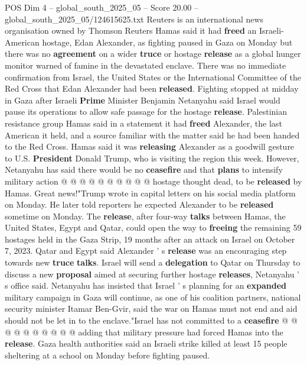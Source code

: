 \begin{textsample}{POS Dim 4 – global\_south\_2025\_05 – Score 20.00 – global\_south\_2025\_05/124615625.txt}  \label{ex:f4_pos_099}
Reuters is an international news organisation owned by Thomson Reuters Hamas said it had \textbf{freed} an Israeli-American hostage, Edan Alexander, as fighting paused in Gaza on Monday but there was no \textbf{agreement} on a wider \textbf{truce} or hostage \textbf{release} as a global hunger monitor warned of famine in the devastated enclave.
There was no immediate confirmation from Israel, the United States or the International Committee of the Red Cross that Edan Alexander had been \textbf{released}.
Fighting stopped at midday in Gaza after Israeli \textbf{Prime} Minister Benjamin Netanyahu said Israel would pause its operations to allow safe passage for the hostage \textbf{release}.
Palestinian resistance group Hamas said in a statement it had \textbf{freed} Alexander, the last American it held, and a source familiar with the matter said he had been handed to the Red Cross.
Hamas said it was \textbf{releasing} Alexander as a goodwill gesture to U.S. \textbf{President} Donald Trump, who is visiting the region this week.
However, Netanyahu has said there would be no \textbf{ceasefire} and that \textbf{plans} to intensify military action @ @ @ @ @ @ @ @ @ @ hostage thought dead, to be \textbf{released} by Hamas.
Great news!"Trump wrote in capital letters on his social media platform on Monday.
He later told reporters he expected Alexander to be \textbf{released} sometime on Monday.
The \textbf{release}, after four-way \textbf{talks} between Hamas, the United States, Egypt and Qatar, could open the way to \textbf{freeing} the remaining 59 hostages held in the Gaza Strip, 19 months after an attack on Israel on October 7, 2023.
Qatar and Egypt said Alexander ' s \textbf{release} was an encouraging step towards new \textbf{truce} \textbf{talks}.
Israel will send a \textbf{delegation} to Qatar on Thursday to discuss a new \textbf{proposal} aimed at securing further hostage \textbf{releases}, Netanyahu ' s office said.
Netanyahu has insisted that Israel ' s planning for an \textbf{expanded} military campaign in Gaza will continue, as one of his coalition partners, national security minister Itamar Ben-Gvir, said the war on Hamas must not end and aid should not be let in to the enclave."Israel has not committed to a \textbf{ceasefire} @ @ @ @ @ @ @ @ @ @ adding that military pressure had forced Hamas into the \textbf{release}.
Gaza health authorities said an Israeli strike killed at least 15 people sheltering at a school on Monday before fighting paused.

\end{textsample}
